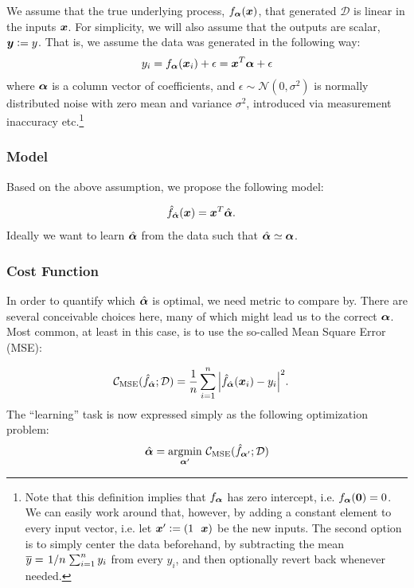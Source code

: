 \documentclass[Thesis.tex]{subfiles}
\begin{document}
We assume that the true underlying process, $f_{\bm{\alpha}}(\bm{x})$, that generated
$\mathcal{D}$ is linear in the inputs $\bm{x}$. For simplicity, we will also
assume that the outputs are scalar, $\bm{y} \vcentcolon= y$. That is, we assume the data
was generated in the following way:
\begin{align}
  y_i = f_{\bm{\alpha}}(\bm{x}_i) + \epsilon = \bm{x}^T\bm{\alpha} + \epsilon
\end{align}
where $\bm{\alpha}$ is a column vector of coefficients, and
$\epsilon\sim\mathcal{N}(0, \sigma^2)$ is normally distributed noise with zero
mean and variance $\sigma^2$, introduced via measurement inaccuracy
etc.\footnote{Note that this definition implies that $f_{\bm{\alpha}}$
  has zero intercept, i.e. $f_{\bm{\alpha}}(\bm{0}) = 0$. We can easily work around
  that, however, by adding a constant element to every input vector, i.e. let
  $\vx' \defeq (1\ \ \vx)$ be the new inputs. The second option is to simply
  center the data beforehand, by subtracting the mean $\overline y =
  \flatfrac{1}{n}\sum_{i=1}^n y_i$ from every $y_i$, and then optionally revert
  back whenever needed.}

\subsubsection{Model}

Based on the above assumption, we propose the following model:

\begin{align}
\hat f_{\hat{\bm{\alpha}}}(\bm{x}) &= \bm{x}^T\hat{\bm{\alpha}}.
\end{align}
Ideally we want to learn $\hat{\bm{\alpha}}$ from the data such that
$\hat{\bm{\alpha}}\simeq\bm{\alpha}$.

\subsubsection{Cost Function}

In order to quantify which $\hat{\bm{\alpha}}$ is optimal, we need metric to compare
by. There are several conceivable choices here, many of which might lead us to
the correct $\bm{\alpha}$. Most common, at least in this case, is to use the
so-called Mean Square Error (MSE):

\begin{align}
  \mathcal{C}_\text{MSE}(\hat f_{\hat{\bm{\alpha}}}; \mathcal{D}) &= \frac{1}{n}\sum_{i=1}^n \abs{\hat f_{\hat{\bm{\alpha}}}(\bm{x}_i) - y_i}^2.
\end{align}
The ``learning'' task is now expressed simply as the following optimization problem:
\begin{align}
  \label{eq:mse-optimization-problem-example}
  \hat{\bm{\alpha}} = \operatorname*{argmin}_{\bm{\alpha}'}\,\mathcal{C}_\text{MSE}(\hat f_{\bm{\alpha}'}; \mathcal{D})
\end{align}
\end{document}
